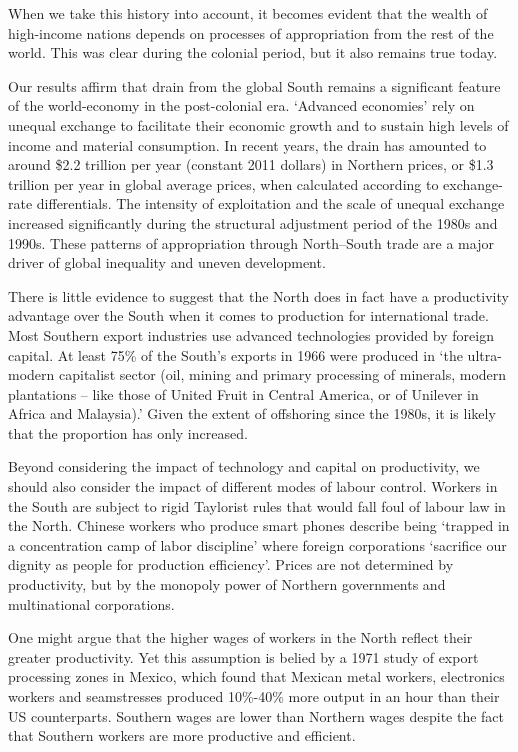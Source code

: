 \documentclass[
]{book}
\begin{document}
When we take this history into account, it becomes evident
that the wealth of high-income nations depends on processes of appropriation
from the rest of the world.
This was clear during the colonial period, but it also remains true today.

Our results affirm that drain from the global South remains a significant
feature of the world-economy in the post-colonial era.
`Advanced economies' rely on unequal exchange to facilitate
their economic growth and to sustain high levels of income and material consumption.
In recent years, the drain has amounted to around \$2.2 trillion per year
(constant 2011 dollars) in Northern prices, or
\$1.3 trillion per year in global average prices,
when calculated according to exchange-rate differentials.
The intensity of exploitation and the scale of unequal exchange increased
significantly during the structural adjustment period of the 1980s and 1990s.
These patterns of appropriation through North--South trade are a major
driver of global inequality and uneven development.

There is little evidence to suggest that the North does in fact have
a productivity advantage over the South when it comes to production for
international trade.
Most Southern export industries use advanced technologies provided by foreign capital.
At least 75\% of the South's exports in 1966 were produced in `the
ultra-modern capitalist sector (oil, mining and primary processing of minerals,
modern plantations -- like those of United Fruit in Central America, or
of Unilever in Africa and Malaysia).'
Given the extent of offshoring since the 1980s,
it is likely that the proportion has only increased.

Beyond considering the impact of technology and capital on productivity,
we should also consider the impact of different modes of labour control.
Workers in the South are subject to rigid Taylorist rules that
would fall foul of labour law in the North.
Chinese workers who produce smart phones describe being `trapped in a concentration
camp of labor discipline' where foreign corporations `sacrifice our dignity
as people for production efficiency'.
Prices are not determined by productivity, but by the monopoly power of
Northern governments and multinational corporations.

One might argue that the higher wages of workers in the North
reflect their greater productivity.
Yet this assumption is belied by a 1971 study of export processing zones in Mexico, which
found that Mexican metal workers, electronics workers and seamstresses produced 10\%-40\% more
output in an hour than their US counterparts.
Southern wages are lower than Northern wages despite the fact that Southern
workers are more productive and efficient.
\end{document}
